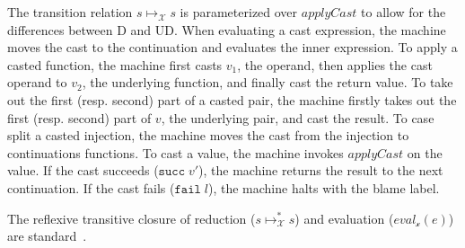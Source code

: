 \documentclass[acmsmall,review,anonymous]{acmart}\settopmatter{printfolios=true,printccs=false,printacmref=false}
\newcommand{\rOOsucc}[1]{\mathtt{succ}\;#1}
\newcommand{\rOOfail}[1]{\mathtt{fail}\;#1}
\newcommand{\judgeCreduce}[2]{#1 \longmapsto_{\mathcal{X}} #2}
\newcommand{\judgeCreduceTrans}[2]{#1 \longmapsto_{\mathcal{X}}^{*} #2}
\begin{document}
The transition relation $\judgeCreduce{s}{s}$ is parameterized over
$applyCast$ to allow for the differences between D and UD.
%
When evaluating a cast expression, the machine moves the cast to the
continuation and evaluates the inner expression.
To apply a casted function, the machine first casts $v_1$, the
operand, then applies the cast operand to $v_2$, the underlying
function, and finally cast the return value.
%
To take out the first (resp. second) part of a casted pair, the
machine firstly takes out the first (resp. second) part of $v$, the
underlying pair, and cast the result.
%
%
To case split a casted injection, the machine moves the cast from
the injection to continuations functions.
%
To cast a value, the machine invokes $applyCast$ on the value. If the cast 
succeeds ($\rOOsucc{v'}$), the machine returns the result to the next
continuation.  If the cast fails ($\rOOfail{l}$), the machine halts with the 
blame label.

%

The reflexive transitive closure of reduction ($\judgeCreduceTrans{s}{s}$) and 
evaluation ($eval_\mathcal{x}(e)$) are standard~\citep{felleisen03:_pllc}.
\end{document}

